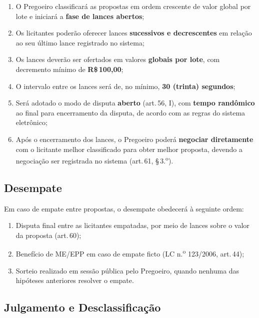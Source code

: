 \documentclass[12pt,a4paper]{article}
\newcommand{\art}[1]{art.\,#1}
\begin{document}
\begin{enumerate}
  \item O Pregoeiro classificará as propostas em ordem crescente de valor global
    por lote e iniciará a \textbf{fase de lances abertos};

  \item Os licitantes poderão oferecer lances \textbf{sucessivos e decrescentes}
    em relação ao seu último lance registrado no sistema;

  \item Os lances deverão ser ofertados em valores \textbf{globais por lote},
    com decremento mínimo de \textbf{R\$\,100,00};

  \item O intervalo entre os lances será de, no mínimo, \textbf{30 (trinta)
    segundos};

  \item Será adotado o modo de disputa \textbf{aberto} (\art{56}, I), com
    \textbf{tempo randômico} ao final para encerramento da disputa, de acordo
    com as regras do sistema eletrônico;

  \item Após o encerramento dos lances, o Pregoeiro poderá \textbf{negociar
    diretamente} com o licitante melhor classificado para obter melhor proposta,
    devendo a negociação ser registrada no sistema (\art{61}, \S\,3.\textsuperscript{o}).
\end{enumerate}

\subsection{Desempate}

Em caso de empate entre propostas, o desempate obedecerá à seguinte ordem:

\begin{enumerate}
  \item Disputa final entre as licitantes empatadas, por meio de lances sobre
    o valor da proposta (\art{60});
  \item Benefício de ME/EPP em caso de empate ficto (LC n.\textsuperscript{o}
    123/2006, \art{44});
  \item Sorteio realizado em sessão pública pelo Pregoeiro, quando nenhuma das
    hipóteses anteriores resolver o empate.
\end{enumerate}

\subsection{Julgamento e Desclassificação}
\end{document}
